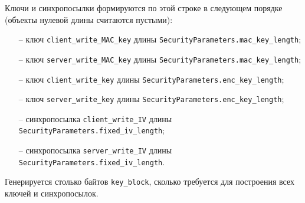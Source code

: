 Ключи и синхропосылки формируются по этой строке в следующем порядке 
(объекты нулевой длины считаются пустыми): 
\begin{itemize}
\item[--] 
ключ \lstinline{client_write_MAC_key} длины 
\lstinline{SecurityParameters.mac_key_length}; 

\item[--]
ключ \lstinline{server_write_MAC_key} длины 
\lstinline{SecurityParameters.mac_key_length}; 

\item[--]
ключ \lstinline{client_write_key} длины 
\lstinline{SecurityParameters.enc_key_length}; 

\item[--]
ключ \lstinline{server_write_key} длины 
\lstinline{SecurityParameters.enc_key_length}; 

\item[--]
синхропосылка \lstinline{client_write_IV} длины 
\lstinline{SecurityParameters.fixed_iv_length}; 

\item[--]
синхропосылка \lstinline{server_write_IV} длины 
\lstinline{SecurityParameters.fixed_iv_length}. 
\end{itemize}

Генерируется столько байтов \lstinline{key_block}, сколько требуется для 
построения всех ключей и синхропосылок. 

